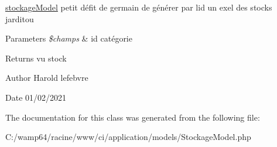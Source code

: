 \mbox{\hyperlink{classstockage_model}{stockage\+Model}} petit défit de germain de générer par l\textquotesingle{}id un exel des stocks jarditou 


\begin{DoxyParams}{Parameters}
{\em \$champs} & id catégorie \\
\hline
\end{DoxyParams}
\begin{DoxyReturn}{Returns}
vu stock 
\end{DoxyReturn}
\begin{DoxyAuthor}{Author}
Harold lefebvre 
\end{DoxyAuthor}
\begin{DoxyDate}{Date}
01/02/2021 
\end{DoxyDate}


The documentation for this class was generated from the following file\+:\begin{DoxyCompactItemize}
\item 
C\+:/wamp64/racine/www/ci/application/models/Stockage\+Model.\+php\end{DoxyCompactItemize}
